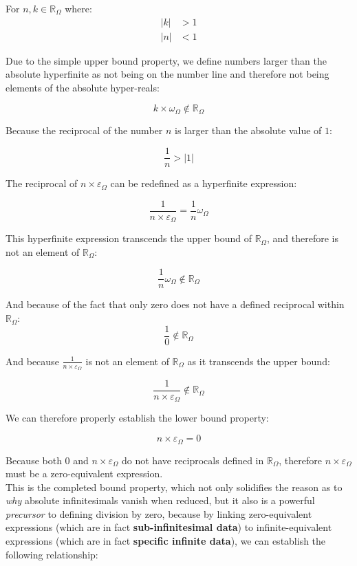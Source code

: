 \documentclass{article}
\begin{document}
For $n, k \in \mathbb{R}_\Omega$ where:
\begin{align*}
|k| &> 1 \\
|n| &< 1
\end{align*}

Due to the simple upper bound property, we define numbers larger than the absolute hyperfinite as not being on the number line and therefore not being elements of the absolute hyper-reals:

$$k \times \omega_\Omega \notin \mathbb{R}_\Omega$$

Because the reciprocal of the number $n$ is larger than the absolute value of $1$:

$$\frac{1}{n} > |1|$$

The reciprocal of $n \times \varepsilon_\Omega$ can be redefined as a hyperfinite expression:

$$\frac{1}{n \times \varepsilon_\Omega} = \frac{1}{n}\omega_\Omega$$

This hyperfinite expression transcends the upper bound of $\mathbb{R}_\Omega$, and therefore is not an element of $\mathbb{R}_\Omega$:

$$\frac{1}{n}\omega_\Omega \notin \mathbb{R}_\Omega$$

And because of the fact that only zero does not have a defined reciprocal within $\mathbb{R}_\Omega$: $$\frac{1}{0}\notin\mathbb{R}_\Omega$$

And because $\frac{1}{n \times \varepsilon_\Omega}$ is not an element of $\mathbb{R}_\Omega$ as it transcends the upper bound:

$$\frac{1}{n \times \varepsilon_\Omega} \notin \mathbb{R}_\Omega$$

We can therefore properly establish the lower bound property:

$$n \times \varepsilon_\Omega = 0$$

Because both $0$ and $n \times \varepsilon_\Omega$ do not have reciprocals defined in $\mathbb{R}_\Omega$, therefore $n \times \varepsilon_\Omega$ must be a zero-equivalent expression.\\This is the completed bound property, which not only solidifies the reason as to \textit{why} absolute infinitesimals vanish when reduced, but it also is a powerful \textit{precursor} to defining division by zero, because by linking zero-equivalent expressions (which are in fact \textbf{sub-infinitesimal data}) to infinite-equivalent expressions (which are in fact \textbf{specific infinite data}), we can establish the following relationship:
\end{document}
